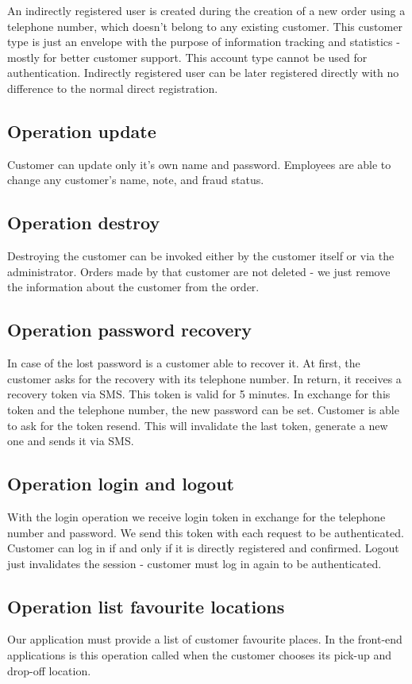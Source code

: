 			An indirectly registered user is created during the creation of a new order using a telephone number, which doesn't belong to any existing customer. This customer type is just an envelope with the purpose of information tracking and statistics - mostly for better customer support. This account type cannot be used for authentication. Indirectly registered user can be later registered directly with no difference to the normal direct registration.
		
		
		\subsection{Operation update}
			Customer can update only it's own name and password. Employees are able to change any customer's name, note, and fraud status.
		\subsection{Operation destroy}
            Destroying the customer can be invoked either by the customer itself or via the administrator. Orders made by that customer are not deleted - we just remove the information about the customer from the order.
		\subsection{Operation password recovery}
			In case of the lost password is a customer able to recover it. At first, the customer asks for the recovery with its telephone number. In return, it receives a recovery token via SMS. This token is valid for 5 minutes. In exchange for this token and the telephone number, the new password can be set. Customer is able to ask for the token resend. This will invalidate the last token, generate a new one and sends it via SMS.
		\subsection{Operation login and logout}
			With the login operation we receive login token in exchange for the telephone number and password. We send this token with each request to be authenticated.
			Customer can log in if and only if it is directly registered and confirmed.
			Logout just invalidates the session - customer must log in again to be authenticated.
		\subsection{Operation list favourite locations}
		    Our application must provide a list of customer favourite places. In the front-end applications is this operation called when the customer chooses its pick-up and drop-off location. 
		
